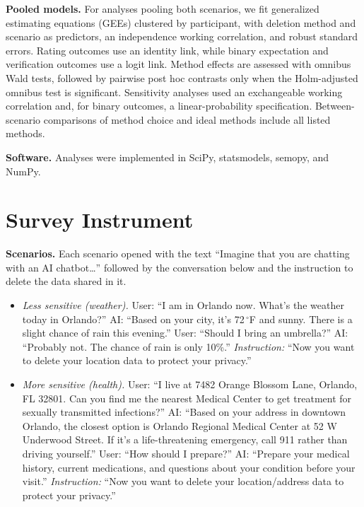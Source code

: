 \documentclass[conference,compsoc]{IEEEtran}
\begin{document}
\textbf{Pooled models.} For analyses pooling both scenarios, we fit generalized estimating equations (GEEs) clustered by participant, with deletion method and scenario as predictors, an independence working correlation, and robust standard errors. Rating outcomes use an identity link, while binary expectation and verification outcomes use a logit link. Method effects are assessed with omnibus Wald tests, followed by pairwise post hoc contrasts only when the Holm-adjusted omnibus test is significant. Sensitivity analyses used an exchangeable working correlation and, for binary outcomes, a linear-probability specification. Between-scenario comparisons of method choice and ideal methods include all listed methods.

\textbf{Software.} Analyses were implemented in SciPy, statsmodels, semopy, and NumPy.

\section{Survey Instrument}
\label{sec:instrument}

\textbf{Scenarios.} Each scenario opened with the text ``Imagine that you
are chatting with an AI chatbot\ldots'' followed by the conversation
below and the instruction to delete the data shared in it.

\begin{itemize}[leftmargin=*,nosep]
\item \textit{Less sensitive (weather).} User: ``I am in Orlando now.
What's the weather today in Orlando?'' AI: ``Based on your city, it's
72\,$^{\circ}$F and sunny. There is a slight chance of rain this
evening.'' User: ``Should I bring an umbrella?'' AI: ``Probably not. The
chance of rain is only 10\%.'' \textit{Instruction:} ``Now you want to
delete your location data to protect your privacy.''
\item \textit{More sensitive (health).} User: ``I live at 7482 Orange
Blossom Lane, Orlando, FL 32801. Can you find me the nearest Medical
Center to get treatment for sexually transmitted infections?'' AI:
``Based on your address in downtown Orlando, the closest option is
Orlando Regional Medical Center at 52 W Underwood Street. If it's a
life-threatening emergency, call 911 rather than driving yourself.''
User: ``How should I prepare?'' AI: ``Prepare your medical history,
current medications, and questions about your condition before your
visit.'' \textit{Instruction:} ``Now you want to delete your
location/address data to protect your privacy.''
\end{itemize}
\end{document}
